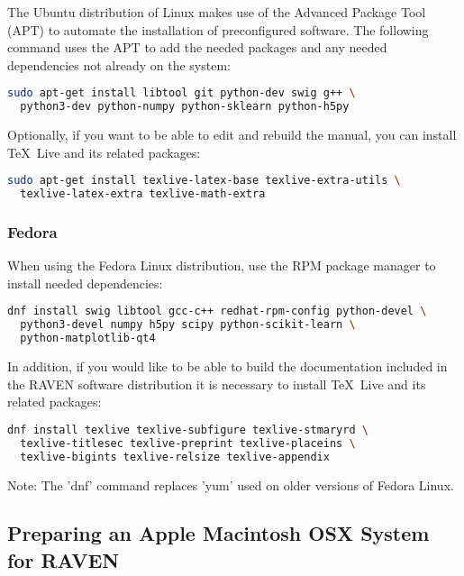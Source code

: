 The Ubuntu distribution of Linux makes use of the Advanced Package Tool 
(APT) to automate the installation of preconfigured software.  The following
command uses the APT to add the needed packages and any needed 
dependencies not already on the system:

\begin{lstlisting}[language=bash]
sudo apt-get install libtool git python-dev swig g++ \
  python3-dev python-numpy python-sklearn python-h5py
\end{lstlisting}

Optionally, if you want to be able to edit and rebuild the manual, you can
install \TeX~Live and its related packages:
\begin{lstlisting}[language=bash]
sudo apt-get install texlive-latex-base texlive-extra-utils \
  texlive-latex-extra texlive-math-extra
\end{lstlisting}

\goToRavenInstallation

\subsubsection{Fedora}

When using the Fedora Linux distribution, use the RPM package manager to 
install needed dependencies:

\begin{lstlisting}[language=bash]
dnf install swig libtool gcc-c++ redhat-rpm-config python-devel \
  python3-devel numpy h5py scipy python-scikit-learn \
  python-matplotlib-qt4
\end{lstlisting}

In addition, if you would like to be able to build the documentation 
included in the RAVEN software distribution it is necessary to install 
\TeX~Live and its related packages:
\begin{lstlisting}[language=bash]
dnf install texlive texlive-subfigure texlive-stmaryrd \
  texlive-titlesec texlive-preprint texlive-placeins \
  texlive-bigints texlive-relsize texlive-appendix
\end{lstlisting}

Note: The 'dnf' command replaces 'yum' used on older versions of
Fedora Linux.

\goToRavenInstallation

\subsection{Preparing an Apple Macintosh OSX System for RAVEN}
\label{sysprep_osx}

